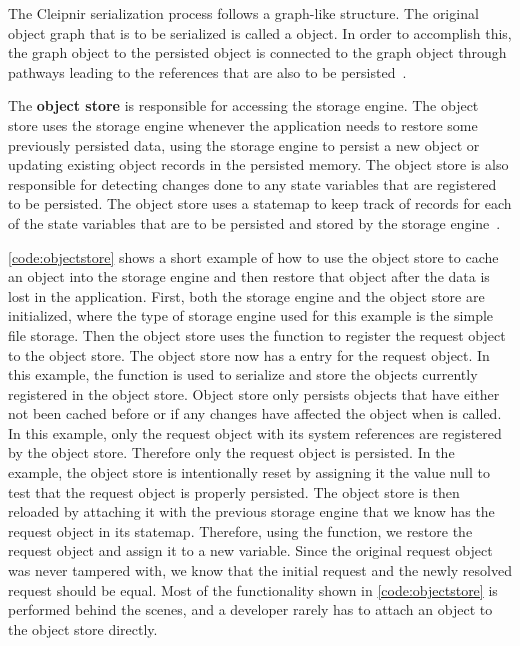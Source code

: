 The Cleipnir serialization process follows a graph-like structure. The original object graph that is to be serialized is called a  object. In order to accomplish this, the  graph object to the persisted object is connected to the graph object through pathways leading to the references that are also to be persisted~\cite[p.~10]{PAPER:PaxosCleipnir}.


The \textbf{object store} is responsible for accessing the storage engine. The object store uses the storage engine whenever the application needs to restore some previously persisted data, using the storage engine to persist a new object or updating existing object records in the persisted memory. The object store is also responsible for detecting changes done to any state variables that are registered to be persisted.
The object store uses a statemap to keep track of records for each of the state variables that are to be persisted and stored by the storage engine~\cite[p.~11]{PAPER:PaxosCleipnir}.

\autoref{code:objectstore} shows a short example of how to use the object store to cache an object into the storage engine and then restore that object after the data is lost in the application. First, both the storage engine and the object store are initialized, where the type of storage engine used for this example is the simple file storage. Then the object store uses the  function to register the request object to the object store.  The object store now has a  entry for the request object. In this example, the  function is used to serialize and store the objects currently registered in the object store. Object store only persists objects that have either not been cached before or if any changes have affected the object when  is called. In this example, only the request object with its system references are registered by the object store. Therefore only the request object is persisted. In the example, the object store is intentionally reset by assigning it the value null to test that the request object is properly persisted. The object store is then reloaded by attaching it with the previous storage engine that we know has the request object in its statemap. Therefore, using the  function, we restore the request object and assign it to a new variable. Since the original request object was never tampered with, we know that the initial request and the newly resolved request should be equal. Most of the functionality shown in \autoref{code:objectstore} is performed behind the scenes, and a developer rarely has to attach an object to the object store directly. 

